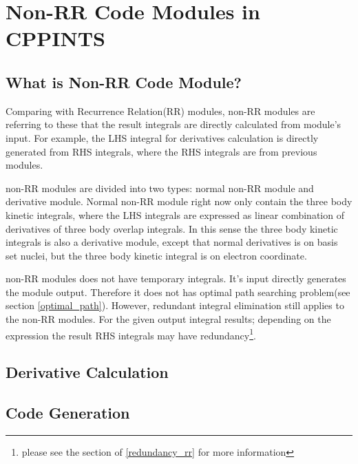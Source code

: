 


\chapter{Non-RR Code Modules in CPPINTS}

\section{What is Non-RR Code Module?}
\label{what_is_non_rr}

Comparing with Recurrence Relation(RR) modules, non-RR modules are referring to these
that the result integrals are directly calculated from module's input. For example,
the LHS integral for derivatives calculation is directly generated from RHS integrals,
where the RHS integrals are from previous modules.

non-RR modules are divided into two types: normal non-RR module and derivative module.
Normal non-RR module right now only contain the three body kinetic integrals, where 
the LHS integrals are expressed as linear combination of derivatives of three 
body overlap integrals. In this sense the three body kinetic integrals is also a 
derivative module, except that normal derivatives is on basis set nuclei, but the 
three body kinetic integral is on electron coordinate.

non-RR modules does not have temporary integrals. It's input directly generates the 
module output. Therefore it does not has optimal path searching problem(see section
\ref{optimal_path}). However, redundant integral elimination still applies to the 
non-RR modules. For the given output integral results; depending on the expression
the result RHS integrals may have redundancy\footnote{please see the section of 
\ref{redundancy_rr} for more information}.

\section{Derivative Calculation}

\section{Code Generation}
\label{code_generation}